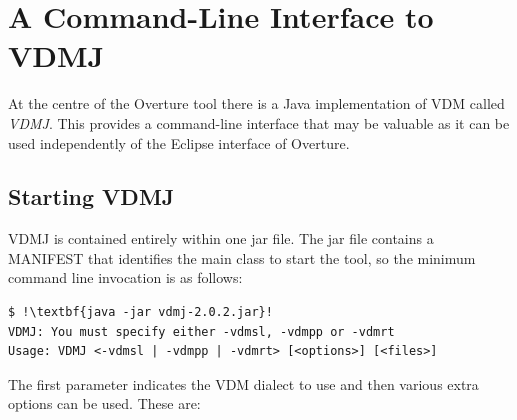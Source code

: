 \documentclass{overturerepchap}
\begin{document}
\chapter{A Command-Line Interface to VDMJ}\label{sec:commandline}

At the centre of the Overture tool there is a Java implementation of VDM
called \emph{VDMJ}. This provides a command-line interface that may be valuable
as it can be used independently of the Eclipse interface of Overture.

\section{Starting VDMJ}

VDMJ is contained entirely within one jar file. The jar
file contains a MANIFEST that identifies the main class to start the
tool, so the minimum command line invocation is as follows:

\lstset{style=tool,language=}
\begin{lstlisting}
$ !\textbf{java -jar vdmj-2.0.2.jar}!
VDMJ: You must specify either -vdmsl, -vdmpp or -vdmrt
Usage: VDMJ <-vdmsl | -vdmpp | -vdmrt> [<options>] [<files>]
\end{lstlisting}
\lstset{style=mystyle}
\lstset{language=VDM++}

The first parameter indicates the VDM dialect to use and then
various extra options can be used. These are:
\end{document}

